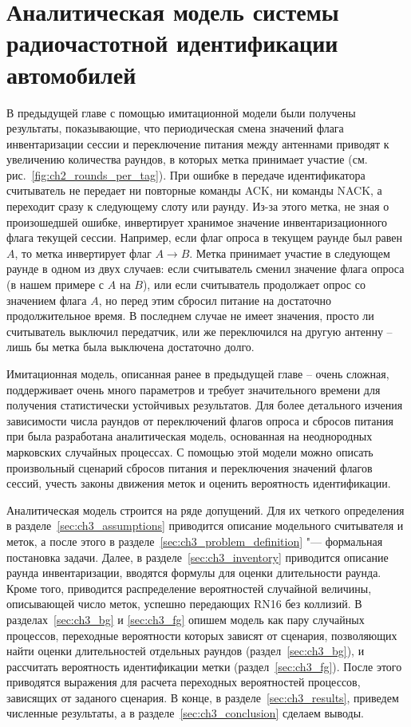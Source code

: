 \chapter{Аналитическая модель системы радиочастотной идентификации автомобилей}\label{ch:ch3}


В предыдущей главе с помощью имитационной модели были получены результаты, показывающие, что периодическая смена значений флага инвентаризации сессии и переключение питания между антеннами приводят к увеличению количества раундов, в которых метка принимает участие (см. рис.~\ref{fig:ch2_rounds_per_tag}). При ошибке в передаче идентификатора считыватель не передает ни повторные команды ACK, ни команды NACK, а переходит сразу к следующему слоту или раунду. Из-за этого метка, не зная о произошедшей ошибке, инвертирует хранимое значение инвентаризационного флага текущей сессии. Например, если флаг опроса в текущем раунде был равен $A$, то метка инвертирует флаг $A \rightarrow B$. Метка принимает участие в следующем раунде в одном из двух случаев: если считыватель сменил значение флага опроса (в нашем примере с $A$ на $B$), или если считыватель продолжает опрос со значением флага $A$, но перед этим сбросил питание на достаточно продолжительное время. В последнем случае не имеет значения, просто ли считыватель выключил передатчик, или же переключился на другую антенну -- лишь бы метка была выключена достаточно долго.

Имитационная модель, описанная ранее в предыдущей главе -- очень сложная, поддерживает очень много параметров и требует значительного времени для получения статистически устойчивых результатов. Для более детального изчения зависимости числа раундов от переключений флагов опроса и сбросов питания при была разработана аналитическая модель, основанная на неоднородных марковских случайных процессах. С помощью этой модели можно описать произвольный сценарий сбросов питания и переключения значений флагов сессий, учесть законы движения меток и оценить вероятность идентификации.

Аналитическая модель строится на ряде допущений. Для их четкого определения в разделе~\ref{sec:ch3_assumptions} приводится описание модельного считывателя и меток, а после этого в разделе~\ref{sec:ch3_problem_definition} "--- формальная постановка задачи. Далее, в разделе~\ref{sec:ch3_inventory} приводится описание раунда инвентаризации, вводятся формулы для оценки длительности раунда. Кроме того, приводится распределение вероятностей случайной величины, описывающей число меток, успешно передающих RN16 без коллизий. В разделах~\ref{sec:ch3_bg} и \ref{sec:ch3_fg} опишем модель как пару случайных процессов, переходные вероятности которых зависят от сценария, позволяющих найти оценки длительностей отдельных раундов (раздел~\ref{sec:ch3_bg}), и рассчитать вероятность идентификации метки (раздел~\ref{sec:ch3_fg}). После этого приводятся выражения для расчета переходных вероятностей процессов, зависящих от заданого сценария. В конце, в разделе~\ref{sec:ch3_results}, приведем численные результаты, а в разделе~\ref{sec:ch3_conclusion} сделаем выводы.

